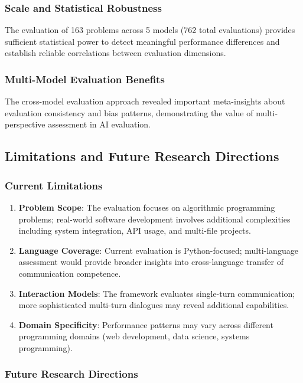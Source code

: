 \documentclass[conference]{IEEEtran}
\begin{document}
\subsubsection{Scale and Statistical Robustness}

The evaluation of 163 problems across 5 models (762 total evaluations) provides sufficient statistical power to detect meaningful performance differences and establish reliable correlations between evaluation dimensions.

\subsubsection{Multi-Model Evaluation Benefits}

The cross-model evaluation approach revealed important meta-insights about evaluation consistency and bias patterns, demonstrating the value of multi-perspective assessment in AI evaluation.

\subsection{Limitations and Future Research Directions}

\subsubsection{Current Limitations}

\begin{enumerate}
    \item \textbf{Problem Scope}: The evaluation focuses on algorithmic programming problems; real-world software development involves additional complexities including system integration, API usage, and multi-file projects.
    \item \textbf{Language Coverage}: Current evaluation is Python-focused; multi-language assessment would provide broader insights into cross-language transfer of communication competence.
    \item \textbf{Interaction Models}: The framework evaluates single-turn communication; more sophisticated multi-turn dialogues may reveal additional capabilities.
    \item \textbf{Domain Specificity}: Performance patterns may vary across different programming domains (web development, data science, systems programming).
\end{enumerate}

\subsubsection{Future Research Directions}
\end{document}
